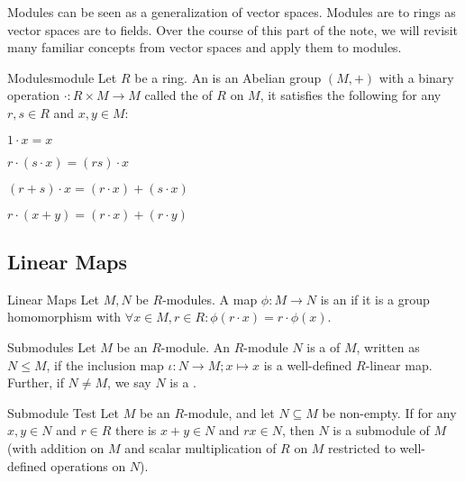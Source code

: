 \documentclass{styles/tufte}
\begin{document}
Modules can be seen as a generalization of vector spaces. Modules are to rings as vector spaces are to fields. Over the course of this part of the note, we will revisit many familiar concepts from vector spaces and apply them to modules.

\begin{definition}{Modules}{module}
  Let $R$ be a ring. An  is an Abelian group $(M, +)$ with a binary operation $\cdot: R \times M \to M$ called the  of $R$ on $M$, it satisfies the following for any $r, s \in R$ and $x, y \in M$:
  \begin{romanenum}
    \item $1 \cdot x = x$
    \item $r \cdot (s \cdot x) = (rs) \cdot x$
    \item $(r + s) \cdot x = (r \cdot x) + (s \cdot x)$
    \item $r \cdot (x + y) = (r \cdot x) + (r \cdot y)$
  \end{romanenum}
\end{definition}


\subsection{Linear Maps}

  \begin{definition}{Linear Maps}{}
    Let $M, N$ be $R$-modules. A map $\phi: M \to N$ is an  if it is a group homomorphism with $\forall x \in M, r \in R: \phi(r \cdot x) = r \cdot \phi(x)$.
  \end{definition}
  
  \begin{definition}{Submodules}{}
    Let $M$ be an $R$-module. An $R$-module $N$ is a  of $M$, written as $N \leqslant M$, if the inclusion map $\iota: N \to M; x \mapsto x$ is a well-defined $R$-linear map. Further, if $N \neq M$, we say $N$ is a .
  \end{definition}
  
  \begin{proposition}{Submodule Test}{}
    Let $M$ be an $R$-module, and let $N \subseteq M$ be non-empty. If for any $x, y \in N$ and $r \in R$ there is $x + y \in N$ and $rx \in N$, then $N$ is a submodule of $M$ (with addition on $M$ and scalar multiplication of $R$ on $M$ restricted to well-defined operations on $N$).
  \end{proposition}
\end{document}
